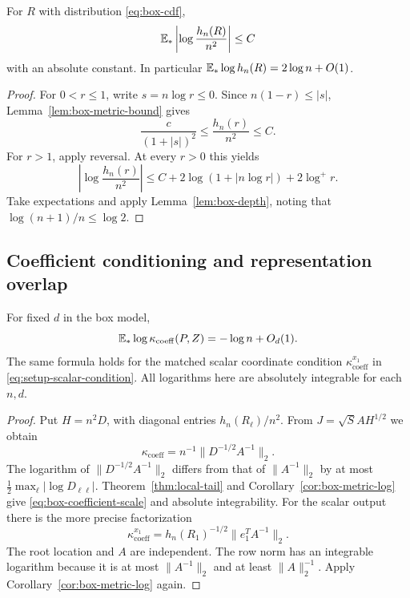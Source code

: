 \begin{corollary}\label{cor:box-metric-log}
For $R$ with distribution \eqref{eq:box-cdf},
\begin{equation}\label{eq:box-metric-log}
 \mathbb E_*\left|\log\frac{h_n(R)}{n^2}\right|\le C
\end{equation}
with an absolute constant. In particular $\mathbb E_*\log h_n(R)=2\log n+O(1)$.
\end{corollary}
\begin{proof}
For $0<r\le1$, write $s=n\log r\le0$. Since
$n(1-r)\le|s|$, Lemma~\ref{lem:box-metric-bound} gives
\[
 \frac{c}{(1+|s|)^2}\le\frac{h_n(r)}{n^2}\le C.
\]
For $r>1$, apply reversal. At every $r>0$ this yields
\[
 \left|\log\frac{h_n(r)}{n^2}\right|
 \le C+2\log(1+|n\log r|)+2\log^+r.
\]
Take expectations and apply Lemma~\ref{lem:box-depth}, noting that
$\log(n+1)/n\le\log2$.
\end{proof}

\subsection{Coefficient conditioning and representation overlap}

\begin{proposition}\label{prop:box-coefficient-scale}
For fixed $d$ in the box model,
\begin{equation}\label{eq:box-coefficient-scale}
 \mathbb E_*\log\kappa_{\mathrm{coeff}}(P,Z)=-\log n+O_d(1).
\end{equation}
The same formula holds for the matched scalar coordinate condition
$\kappa_{\mathrm{coeff}}^{x_1}$ in \eqref{eq:setup-scalar-condition}.
All logarithms here are absolutely integrable for each $n,d$.
\end{proposition}
\begin{proof}
Put $H=n^2D$, with diagonal entries $h_n(R_\ell)/n^2$. From
$J=\sqrt S A H^{1/2}$ we obtain
\[
 \kappa_{\mathrm{coeff}}=n^{-1}\|D^{-1/2}A^{-1}\|_2.
\]
The logarithm of $\|D^{-1/2}A^{-1}\|_2$ differs from that of
$\|A^{-1}\|_2$ by at most
$\tfrac12\max_\ell|\log D_{\ell\ell}|$.
Theorem~\ref{thm:local-tail} and Corollary~\ref{cor:box-metric-log}
give \eqref{eq:box-coefficient-scale} and absolute integrability.
For the scalar output there is the more precise factorization
\begin{equation}\label{eq:box-coordinate-factorization}
 \kappa_{\mathrm{coeff}}^{x_1}
 =h_n(R_1)^{-1/2}\|e_1^T A^{-1}\|_2.
\end{equation}
The root location and $A$ are independent. The row norm has an integrable
logarithm because it is at most $\|A^{-1}\|_2$ and at least
$\|A\|_2^{-1}$. Apply Corollary~\ref{cor:box-metric-log} again.
\end{proof}

